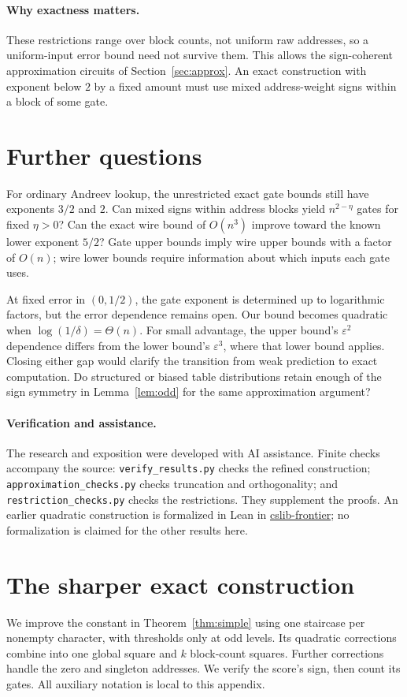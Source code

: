 \documentclass[11pt]{article}
\begin{document}
\paragraph{Why exactness matters.}
These restrictions range over block counts, not uniform raw addresses,
so a uniform-input error bound need not survive them. This allows the
sign-coherent approximation circuits of Section~\ref{sec:approx}.
An exact construction with exponent below $2$ by a fixed amount must
use mixed address-weight signs within a block of some gate.

\section{Further questions}
For ordinary Andreev lookup, the unrestricted exact gate bounds still
have exponents $3/2$ and $2$. Can mixed signs within address blocks
yield $n^{2-\eta}$ gates for fixed $\eta>0$? Can the exact wire bound
of $O(n^3)$ improve toward the known lower exponent $5/2$? Gate upper
bounds imply wire upper bounds with a factor of $O(n)$; wire lower
bounds require information about which inputs each gate uses.

At fixed error in $(0,1/2)$, the gate exponent is determined up to
logarithmic factors, but the error dependence remains open. Our bound
becomes quadratic when $\log(1/\delta)=\Theta(n)$. For small advantage,
the upper bound's $\varepsilon^2$ dependence differs from the lower
bound's $\varepsilon^3$, where that lower bound applies. Closing either
gap would clarify the transition from weak prediction to exact computation.
Do structured or biased table distributions retain enough of the sign
symmetry in Lemma~\ref{lem:odd} for the same approximation argument?

\paragraph{Verification and assistance.}
The research and exposition were developed with AI assistance.
Finite checks accompany the source: \texttt{verify\_results.py} checks
the refined construction; \texttt{approximation\_checks.py} checks
truncation and orthogonality; and \texttt{restriction\_checks.py} checks
the restrictions. They supplement the proofs. An earlier quadratic
construction is formalized in Lean in
\href{https://github.com/cslib-community/cslib-frontier/pull/2813}{cslib-frontier};
no formalization is claimed for the other results here.

\appendix
\section{The sharper exact construction}\label{sec:exact}
We improve the constant in Theorem~\ref{thm:simple} using one staircase
per nonempty character, with thresholds only at odd levels. Its
quadratic corrections combine into one global square and $k$ block-count
squares. Further corrections handle the zero and singleton addresses.
We verify the score's sign, then count its gates. All auxiliary notation
is local to this appendix.
\end{document}
